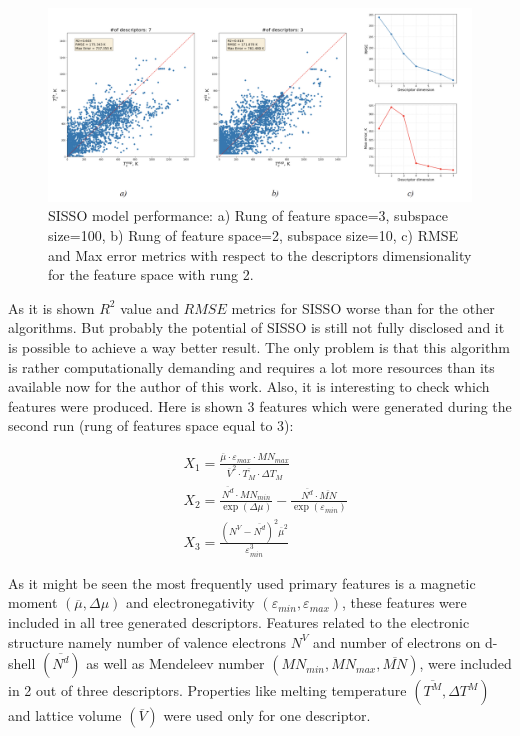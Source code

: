 \begin{figure}[H]
\centering
\captionsetup{justification=centering,margin=2cm}
	\includegraphics[width=160mm]{fig/ml_fig/sisso_results.png}
	\caption[SISSO model performance.]{SISSO model performance: a) Rung of feature space=3, subspace size=100, b) Rung of feature space=2, subspace size=10, c) RMSE and Max error metrics with respect to the descriptors dimensionality for the feature space with rung 2.}
\label{fig:sisso_results}
\end{figure}

As it is shown $R^2$ value and $RMSE$ metrics for SISSO worse than for the other algorithms. But probably the potential of SISSO is still not fully disclosed and it is possible to achieve a way better result. The only problem is that this algorithm is rather computationally demanding and requires a lot more resources than its available now for the author of this work.
Also, it is interesting to check which features were produced. Here is shown 3 features which were generated during the second run (rung of features space equal to 3):

\begin{align}
& X_1 = \frac{\overline \mu \cdot \varepsilon_{max} \cdot MN_{max}}{\overline V^2 \cdot \overline{T_M} \cdot \Delta T_M}\\
& X_2 = \frac{\overline{N^d} \cdot MN_{min}}{\exp \left( \Delta \mu \right)} - \frac{\overline{N^d} \cdot \overline{MN}}{\exp \left(\varepsilon_{min} \right)}\\
&X_3 = \frac{\left( N^V-\overline{N^d} \right)^2 \overline{\mu} ^ 2}{\varepsilon_{min}^3}
\end{align}


As it might be seen the most frequently used primary features is a magnetic moment $(\overline \mu, \Delta \mu)$ and electronegativity $(\varepsilon_{min}, \varepsilon_{max})$, these features were included in all tree generated descriptors. Features related to the electronic structure namely number of valence electrons $N^V$ and number of electrons on d-shell $(\overline{N^d})$ as well as Mendeleev number $(MN_{min},MN_{max},\overline{MN})$, were included in 2 out of three descriptors. Properties like melting temperature $(\overline{T^M}, \Delta T^M)$ and lattice volume $(\overline{V})$ were used only for one descriptor.

